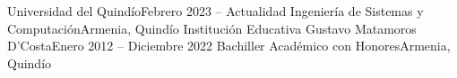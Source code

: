 \resumeSubHeadingListStart
    \resumeSubheading
        {Universidad del Quindío}{Febrero 2023 -- Actualidad}
        {Ingeniería de Sistemas y Computación}{Armenia, Quindío}
    \resumeSubheading
        {Institución Educativa Gustavo Matamoros D'Costa}{Enero 2012 -- Diciembre 2022}
        {Bachiller Académico con Honores}{Armenia, Quindío}
\resumeSubHeadingListEnd
